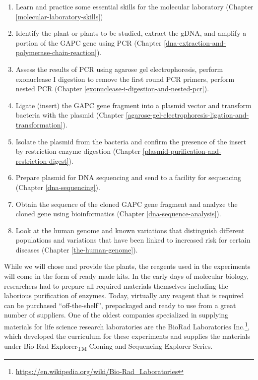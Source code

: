 \documentclass[]{book}
\providecommand{\tightlist}{%
  \setlength{\itemsep}{0pt}\setlength{\parskip}{0pt}}
\let\rmarkdownfootnote\footnote%
\def\footnote{\protect\rmarkdownfootnote}
\renewcommand{\href}[2]{#2\footnote{\url{#1}}}
\begin{document}
\begin{enumerate}
\def\labelenumi{\arabic{enumi}.}
\tightlist
\item
  Learn and practice some essential skills for the molecular laboratory
  (Chapter \ref{molecular-laboratory-skills})
\item
  Identify the plant or plants to be studied, extract the gDNA, and
  amplify a portion of the GAPC gene using PCR (Chapter
  \ref{dna-extraction-and-polymerase-chain-reaction}).
\item
  Assess the results of PCR using agarose gel electrophoresis, perform
  exonuclease I digestion to remove the first round PCR primers, perform
  nested PCR (Chapter \ref{exonuclease-i-digestion-and-nested-pcr}).
\item
  Ligate (insert) the GAPC gene fragment into a plasmid vector and
  transform bacteria with the plasmid (Chapter
  \ref{agarose-gel-electrophoresis-ligation-and-transformation}).
\item
  Isolate the plasmid from the bacteria and confirm the presence of the
  insert by restriction enzyme digestion (Chapter
  \ref{plasmid-purification-and-restriction-digest}).
\item
  Prepare plasmid for DNA sequencing and send to a facility for
  sequencing (Chapter \ref{dna-sequencing}).
\item
  Obtain the sequence of the cloned GAPC gene fragment and analyze the
  cloned gene using bioinformatics (Chapter
  \ref{dna-sequence-analysis}).
\item
  Look at the human genome and known variations that distinguish
  different populations and variations that have been linked to
  increased risk for certain diseases (Chapter \ref{the-human-genome}).
\end{enumerate}

While we will chose and provide the plants, the reagents used in the
experiments will come in the form of ready made kits. In the early days
of molecular biology, researchers had to prepare all required materials
themselves including the laborious purification of enzymes. Today,
virtually any reagent that is required can be purchased
``off-the-shelf'', prepackaged and ready to use from a great number of
suppliers. One of the oldest companies specialized in supplying
materials for life science research laboratories are the
\href{https://en.wikipedia.org/wiki/Bio-Rad_Laboratories}{BioRad
Laboratories Inc.}, which developed the curriculum for these experiments
and supplies the materials under Bio-Rad Explorer\textsubscript{TM}
Cloning and Sequencing Explorer Series.
\end{document}
